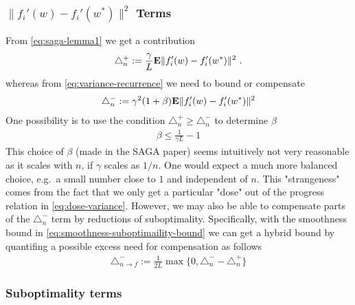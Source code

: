 \documentclass{article}
\newcommand{\E}{{\bf E}}
\begin{document}
\subsubsection{$\| f_i'(w) - f_i'(w^*)\|^2$ Terms}

From \eqref{eq:saga-lemma1} we get a contribution 
\begin{align}
\label{eq:dose-variance}
\triangle_n^+ := \frac{\gamma}{L} \E \| f'_i(w) - f_i'(w^*) \|^2 \ . 
\end{align}
whereas from \eqref{eq:variance-recurrence} we need to bound or compensate
\begin{align}
\triangle_n^- :=  \gamma^2 (1+\beta) \E \| f'_i(w) - f'_i(w^*) \|^2
\end{align}
One possibility is to use the condition $\triangle_n^+ \geq \triangle_n^-$ to determine $\beta$ 
\begin{align}
\beta  \le \frac 1{\gamma L} - 1
\end{align}
This choice of $\beta$ (made in the SAGA paper) seems intuitively not very reasonable as it scales with $n$, if $\gamma$ scales as $1/n$. One would expect a much more balanced choice, e.g.~a small number close to $1$ and independent of $n$. This "strangeness" comes from the fact that we only get a particular "dose" out of the progress relation in \eqref{eq:dose-variance}. However, we may also be able to compensate parts of the $\triangle_n^- $ term by reductions of suboptimality. Specifically, with the smoothness bound in \eqref{eq:smoothness-suboptimaility-bound} we can get a hybrid bound by quantifing a possible excess need for compensation as follows
\begin{align}
\triangle_{n \to f}^{-} := \frac{1}{2L} \max\{0, \triangle_n^- - \triangle_n^+\} 
\label{eq:carryover}
\end{align}

\subsubsection{Suboptimality terms}
\end{document}
